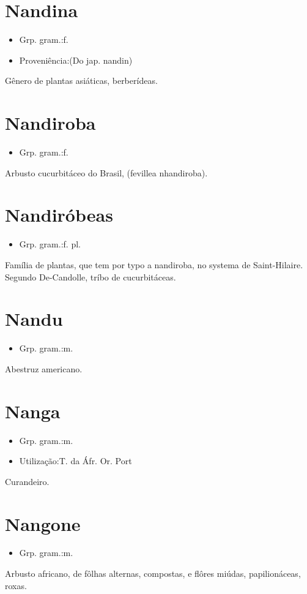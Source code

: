 \section{Nandina}
\begin{itemize}
\item {Grp. gram.:f.}
\end{itemize}
\begin{itemize}
\item {Proveniência:(Do jap. \textunderscore nandin\textunderscore )}
\end{itemize}
Gênero de plantas asiáticas, berberídeas.
\section{Nandiroba}
\begin{itemize}
\item {Grp. gram.:f.}
\end{itemize}
Arbusto cucurbitáceo do Brasil, (\textunderscore fevillea nhandiroba\textunderscore ).
\section{Nandiróbeas}
\begin{itemize}
\item {Grp. gram.:f. pl.}
\end{itemize}
Família de plantas, que tem por typo a nandiroba, no systema de Saint-Hilaire.
Segundo De-Candolle, tríbo de cucurbitáceas.
\section{Nandu}
\begin{itemize}
\item {Grp. gram.:m.}
\end{itemize}
Abestruz americano.
\section{Nanga}
\begin{itemize}
\item {Grp. gram.:m.}
\end{itemize}
\begin{itemize}
\item {Utilização:T. da Áfr. Or. Port}
\end{itemize}
Curandeiro.
\section{Nangone}
\begin{itemize}
\item {Grp. gram.:m.}
\end{itemize}
Arbusto africano, de fôlhas alternas, compostas, e flôres miúdas, papilionáceas, roxas.
